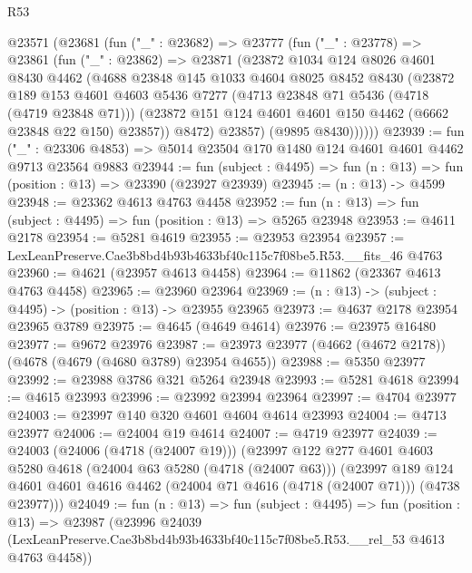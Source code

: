 \begin{lexlean}{R53}
\begin{coremodule}
    @23571
      (@23681
        (fun ("_" : @23682) =>
        @23777
          (fun ("_" : @23778) =>
          @23861
            (fun ("_" : @23862) =>
            @23871
              (@23872
                @1034
                @124
                @8026
                @4601
                @8430
                @4462
                (@4688
                  @23848
                  @145
                  @1033
                  @4604
                  @8025
                  @8452
                  @8430
                  (@23872
                    @189
                    @153
                    @4601
                    @4603
                    @5436
                    @7277
                    (@4713 @23848 @71 @5436 (@4718 (@4719 @23848 @71)))
                    (@23872 @151 @124 @4601 @4601 @150 @4462 (@6662 @23848 @22 @150) @23857))
                  @8472)
                @23857)
              (@9895 @8430))))))
@23939 := fun ("_" : @23306 @4853) =>
  @5014 @23504 @170 @1480 @124 @4601 @4601 @4462 @9713 @23564 @9883
@23944 := fun (subject : @4495) => fun (n : @13) => fun (position : @13) => @23390 (@23927 @23939)
@23945 := (n : @13) -> @4599
@23948 := @23362 @4613 @4763 @4458
@23952 := fun (n : @13) => fun (subject : @4495) => fun (position : @13) => @5265 @23948
@23953 := @4611 @2178
@23954 := @5281 @4619
@23955 := @23953 @23954
@23957 := LexLeanPreserve.Cae3b8bd4b93b4633bf40c115c7f08be5.R53.__fits_46 @4763
@23960 := @4621 (@23957 @4613 @4458)
@23964 := @11862 (@23367 @4613 @4763 @4458)
@23965 := @23960 @23964
@23969 := (n : @13) -> (subject : @4495) -> (position : @13) -> @23955 @23965
@23973 := @4637 @2178 @23954 @23965 @3789
@23975 := @4645 (@4649 @4614)
@23976 := @23975 @16480
@23977 := @9672 @23976
@23987 := @23973 @23977 (@4662 (@4672 @2178)) (@4678 (@4679 (@4680 @3789) @23954 @4655))
@23988 := @5350 @23977
@23992 := @23988 @3786 @321 @5264 @23948
@23993 := @5281 @4618
@23994 := @4615 @23993
@23996 := @23992 @23994 @23964
@23997 := @4704 @23977
@24003 := @23997 @140 @320 @4601 @4604 @4614 @23993
@24004 := @4713 @23977
@24006 := @24004 @19 @4614
@24007 := @4719 @23977
@24039 := @24003
    (@24006 (@4718 (@24007 @19)))
    (@23997
      @122
      @277
      @4601
      @4603
      @5280
      @4618
      (@24004 @63 @5280 (@4718 (@24007 @63)))
      (@23997
        @189
        @124
        @4601
        @4601
        @4616
        @4462
        (@24004 @71 @4616 (@4718 (@24007 @71)))
        (@4738 @23977)))
@24049 := fun (n : @13) =>
  fun (subject : @4495) =>
  fun (position : @13) =>
  @23987
    (@23996
      @24039
      (LexLeanPreserve.Cae3b8bd4b93b4633bf40c115c7f08be5.R53.__rel_53 @4613 @4763 @4458))

\end{coremodule}
\end{lexlean}
